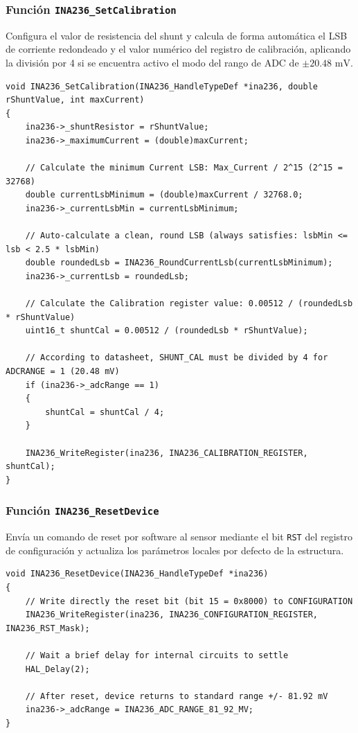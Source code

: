 \documentclass[
10pt, %
a4paper, %
oneside, %
headinclude,footinclude, %
BCOR5mm, %
]{scrartcl}
\begin{document}
\subsubsection{Función \texttt{INA236\_SetCalibration}}
Configura el valor de resistencia del shunt y calcula de forma automática el LSB de corriente redondeado y el valor numérico del registro de calibración, aplicando la división por 4 si se encuentra activo el modo del rango de ADC de $\pm 20.48\text{ mV}$.
\begin{lstlisting}[style=CMakeStyle]
void INA236_SetCalibration(INA236_HandleTypeDef *ina236, double rShuntValue, int maxCurrent)
{
    ina236->_shuntResistor = rShuntValue;
    ina236->_maximumCurrent = (double)maxCurrent;

    // Calculate the minimum Current LSB: Max_Current / 2^15 (2^15 = 32768)
    double currentLsbMinimum = (double)maxCurrent / 32768.0; 
    ina236->_currentLsbMin = currentLsbMinimum;

    // Auto-calculate a clean, round LSB (always satisfies: lsbMin <= lsb < 2.5 * lsbMin)
    double roundedLsb = INA236_RoundCurrentLsb(currentLsbMinimum);
    ina236->_currentLsb = roundedLsb;

    // Calculate the Calibration register value: 0.00512 / (roundedLsb * rShuntValue)
    uint16_t shuntCal = 0.00512 / (roundedLsb * rShuntValue);

    // According to datasheet, SHUNT_CAL must be divided by 4 for ADCRANGE = 1 (20.48 mV)
    if (ina236->_adcRange == 1)
    {
        shuntCal = shuntCal / 4;
    }

    INA236_WriteRegister(ina236, INA236_CALIBRATION_REGISTER, shuntCal);
}
\end{lstlisting}

\subsubsection{Función \texttt{INA236\_ResetDevice}}
Envía un comando de reset por software al sensor mediante el bit \texttt{RST} del registro de configuración y actualiza los parámetros locales por defecto de la estructura.
\begin{lstlisting}[style=CMakeStyle]
void INA236_ResetDevice(INA236_HandleTypeDef *ina236)
{
    // Write directly the reset bit (bit 15 = 0x8000) to CONFIGURATION
    INA236_WriteRegister(ina236, INA236_CONFIGURATION_REGISTER, INA236_RST_Mask);
    
    // Wait a brief delay for internal circuits to settle
    HAL_Delay(2); 
    
    // After reset, device returns to standard range +/- 81.92 mV
    ina236->_adcRange = INA236_ADC_RANGE_81_92_MV;
}
\end{lstlisting}
\end{document}
